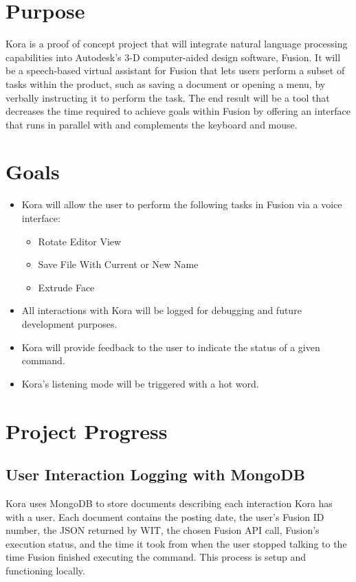 \documentclass[onecolumn, draftclsnofoot,10pt, compsoc]{IEEEtran}
\begin{document}

\section{Purpose}
	Kora is a proof of concept project that will integrate natural language processing capabilities into Autodesk's 3-D computer-aided design software, Fusion.
	It will be a speech-based virtual assistant for Fusion that lets users perform a subset of tasks within the product, such as saving a document or opening a menu, by verbally instructing it to perform the task.
	The end result will be a tool that decreases the time required to achieve goals within Fusion by offering an interface that runs in parallel with and complements the keyboard and mouse.

\section{Goals}
	\begin{itemize}
		\item
			Kora will allow the user to perform the following tasks in Fusion via a voice interface:
			\begin{itemize}
				\item Rotate Editor View
				\item Save File With Current or New Name
				\item Extrude Face
			\end{itemize}
		\item
			All interactions with Kora will be logged for debugging and future development purposes.
		\item
			Kora will provide feedback to the user to indicate the status of a given command.
		\item
			Kora's listening mode will be triggered with a hot word.
	\end{itemize}

\section{Project Progress}
	\subsection{User Interaction Logging with MongoDB}
		Kora uses MongoDB to store documents describing each interaction Kora has with a user.
		Each document contains the posting date, the user's Fusion ID number, the JSON returned by WIT, the chosen Fusion API call, Fusion's execution status, and the time it took from when the user stopped talking to the time Fusion finished executing the command.
		This process is setup and functioning locally.
\end{document}
